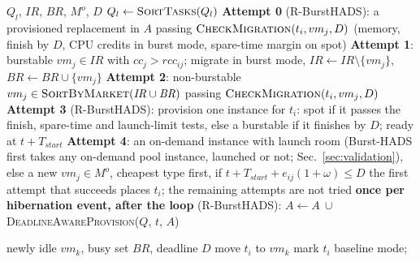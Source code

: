 \documentclass[conference]{IEEEtran}
\begin{document}
\begin{algorithm}[t]
\caption{Burst migration procedure. Inherited from Burst-HADS~\cite{bursthads} (Algorithm~4).}
\label{alg:migrate}
\begin{algorithmic}[1]
\REQUIRE $Q_l$, $\mathit{IR}$, $\mathit{BR}$, $M^{o}$, $D$
\STATE $Q_l \leftarrow \textsc{SortTasks}(Q_l)$ 
  \STATE \textbf{Attempt 0} (R-BurstHADS): a provisioned replacement in $A$
         passing $\textsc{CheckMigration}(t_i,vm_j,D)$ (memory, finish by $D$,
         CPU credits in burst mode, spare-time margin on spot)
  \STATE \textbf{Attempt 1}: burstable $vm_j \in \mathit{IR}$ with
         $\mathit{cc}_j > \mathit{rcc}_{ij}$; migrate in burst mode,
         $\mathit{IR}\!\leftarrow\!\mathit{IR}\setminus\{vm_j\}$,
         $\mathit{BR}\!\leftarrow\!\mathit{BR}\cup\{vm_j\}$
  \STATE \textbf{Attempt 2}: non-burstable $vm_j \in \textsc{SortByMarket}(\mathit{IR}\cup \mathit{BR})$
         passing $\textsc{CheckMigration}(t_i,vm_j,D)$
  \STATE \textbf{Attempt 3} (R-BurstHADS): provision one instance for $t_i$:
         spot if it passes the finish, spare-time and launch-limit tests, else a
         burstable if it finishes by $D$; ready at $t + T_{\mathit{start}}$
  \STATE \textbf{Attempt 4}: an on-demand instance with launch room
         (Burst-HADS first takes any on-demand pool instance, launched or not;
         Sec.~\ref{sec:validation}), else a new $vm_j \in M^{o}$, cheapest type
         first, if $t + T_{\mathit{start}} + e_{ij}(1+\omega) \leq D$
  \STATE the first attempt that succeeds places $t_i$; the remaining attempts
         are not tried
\ENDFOR
\STATE \textbf{once per hibernation event, after the loop} (R-BurstHADS):
       $A \leftarrow A\ \cup$ \textsc{DeadlineAwareProvision}($Q$, $t$, $A$)
\end{algorithmic}
\end{algorithm}

\begin{algorithm}[t]
\caption{Work stealing. Inherited from Burst-HADS~\cite{bursthads} (Algorithm~5).}
\label{alg:steal}
\begin{algorithmic}[1]
\REQUIRE newly idle $vm_k$, busy set $\mathit{BR}$, deadline $D$
      \STATE move $t_i$ to $vm_k$
        \STATE mark $t_i$ baseline mode; \RETURN {}
      \ENDIF
    \ENDIF
  \ENDFOR
\ENDFOR
\end{algorithmic}
\end{algorithm}
\end{document}
